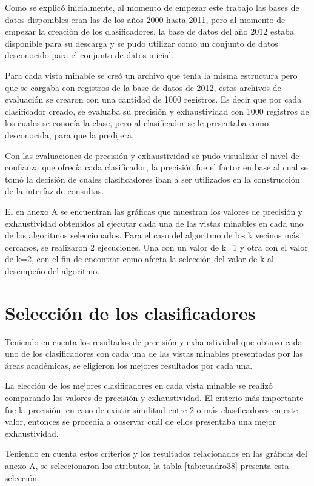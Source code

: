 Como se explicó inicialmente, al momento de empezar este trabajo las bases de datos disponibles eran las de los años 2000 hasta 2011, pero al momento de empezar la creación de los clasificadores, la base de datos del año 2012 estaba disponible para su descarga y se pudo utilizar como un conjunto de datos desconocido para el conjunto de datos inicial.

Para cada vista minable se creó un archivo que tenía la misma estructura pero que se cargaba con registros de la base de datos de 2012, estos archivos de evaluación se crearon con una cantidad de 1000 registros. Es decir que por cada clasificador creado, se evaluaba su precisión y exhaustividad con 1000 registros de los cuales se conocía la clase, pero al clasificador se le presentaba como desconocida, para que la predijera.

Con las evaluaciones de precisión y exhaustividad se pudo visualizar el nivel de confianza que ofrecía cada clasificador, la precisión fue el factor en base al cual se tomó la decisión de cuales clasificadores iban a ser utilizados en la construcción de la interfaz de consultas.

El en anexo A se encuentran las gráficas que muestran los valores de precisión y exhaustividad obtenidos al ejecutar cada una de las vistas minables en cada uno de los algoritmos seleccionados. Para el caso del algoritmo de los k vecinos más cercanos, se realizaron 2 ejecuciones. Una con un valor de k=1 y otra con el valor de k=2, con el fin de encontrar como afecta la selección del valor de k al desempeño del algoritmo.
\section{Selección de los clasificadores}
Teniendo en cuenta los resultados de precisión y exhaustividad que obtuvo cada uno de los clasificadores con cada una de las vistas minables presentadas por las áreas académicas, se eligieron los mejores resultados por cada una.

La elección de los mejores clasificadores en cada vista minable se realizó comparando los valores de precisión y exhaustividad. El criterio más importante fue la precisión, en caso de existir similitud entre 2 o más clasificadores en este valor, entonces se procedía a observar cuál de ellos presentaba una mejor exhaustividad.

Teniendo en cuenta estos criterios y los resultados relacionados en las gráficas del anexo A, se seleccionaron los atributos, la tabla \ref{tab:cuadro38} presenta esta selección.

